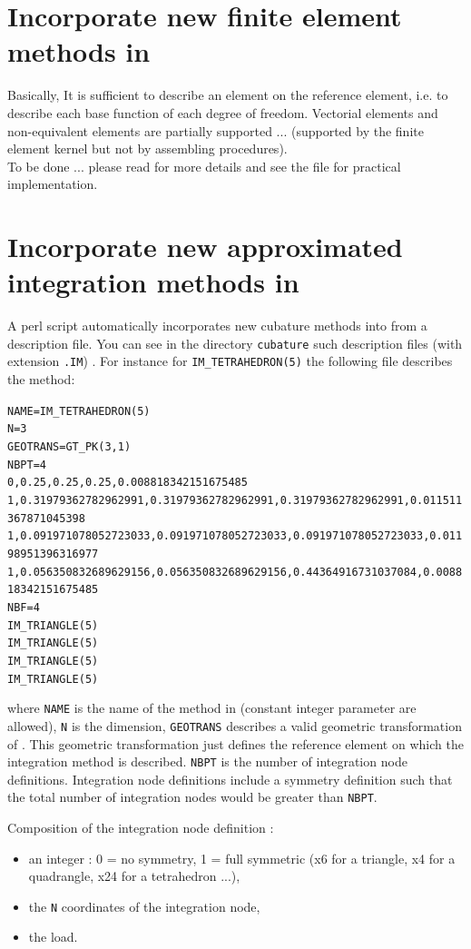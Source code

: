 \documentclass[11pt,a4paper]{article}
\begin{document}
\section{Incorporate new finite element methods in \gf }

Basically, It is sufficient to describe an element on the reference element, i.e. to describe each base function of each degree of freedom. Vectorial elements and non-equivalent elements are partially supported ... (supported by the finite element kernel but not by assembling procedures).\\[0.5cm]
To be done ... please read \cite{BASCOMP} for more details and see the file  for practical implementation.

\section{Incorporate new approximated integration methods in \gf }

A perl script automatically incorporates new cubature methods into \gf from a description file. You can see in the directory {\tt cubature} such description files (with extension {\tt.IM}) . For instance for {\tt IM_TETRAHEDRON(5)} the following file describes the method:

\begin{alltt}
NAME = IM_TETRAHEDRON(5)
N = 3
GEOTRANS = GT_PK(3,1)
NBPT = 4
0, 0.25, 0.25, 0.25, 0.008818342151675485
1, 0.31979362782962991, 0.31979362782962991, 0.31979362782962991, 0.011511367871045398 
1, 0.091971078052723033, 0.091971078052723033, 0.091971078052723033, 0.01198951396316977
1, 0.056350832689629156, 0.056350832689629156, 0.44364916731037084, 0.008818342151675485
NBF = 4
IM_TRIANGLE(5)
IM_TRIANGLE(5)
IM_TRIANGLE(5)
IM_TRIANGLE(5)
\end{alltt}

where {\tt NAME} is the name of the method in \gf (constant integer parameter are allowed), {\tt N} is the dimension, {\tt GEOTRANS} describes a valid geometric transformation of \gf. This geometric transformation just defines the reference element on which the integration method is described. {\tt NBPT} is the number of integration node definitions. Integration node definitions include a symmetry definition such that the total number of integration nodes would be greater than {\tt NBPT}.

Composition of the integration node definition :
\begin{itemize}
  \item an integer : 0 = no symmetry, 1 = full symmetric (x6 for a triangle, x4 for a quadrangle, x24 for a tetrahedron ...),
  \item the {\tt N} coordinates of the integration node,
  \item the load.
\end{itemize}
\end{document}
